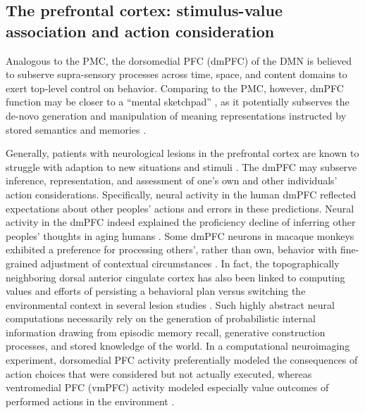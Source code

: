 \documentclass[10pt,letterpaper]{article}
\begin{document}
\subsection{The prefrontal cortex: stimulus-value association and action consideration}
Analogous to the PMC,
the dorsomedial PFC (dmPFC) of the DMN is believed to subserve
supra-sensory processes
across time, space, and content domains to
exert top-level control on behavior.
Comparing to the PMC, however,
dmPFC function may be closer to a
``mental sketchpad'' \citep{goldman1996prefrontal}, as it
potentially subserves the de-novo generation and manipulation
of meaning representations instructed by stored semantics and memories
\citep{bzdok2013segregation}.



Generally,
patients with neurological lesions in the prefrontal cortex
are known to struggle with
adaption to new situations and stimuli
\citep{stuss1986frontal}.
The dmPFC may subserve inference, representation, and assessment
of one's own and other individuals' action considerations.
Specifically, neural activity in the human dmPFC
reflected expectations about other peoples' actions and
errors in these predictions.
Neural activity in the dmPFC indeed explained the proficiency decline
of inferring other peoples' thoughts in aging humans \citep{moran2012social}.
Some dmPFC neurons in macaque monkeys exhibited a preference
for processing others', rather than own, behavior
with fine-grained adjustment of contextual circumstances \citep{yoshida2010neural}.
In fact, the topographically neighboring dorsal anterior cingulate cortex
has also been linked to computing values and efforts of
persisting a behavioral plan versus switching the
environmental context in several lesion studies \citep{kolling2016value}.
%
Such highly abstract neural computations necessarily rely on the
generation of probabilistic internal information drawing from
episodic memory recall, generative construction processes,
and stored knowledge of the world.
%
In a computational neuroimaging experiment,
dorsomedial PFC activity preferentially modeled the consequences of
action choices that were considered but not actually executed,
whereas ventromedial PFC (vmPFC) activity
modeled especially value outcomes of performed actions in the environment
\citep{nicolle2012agent}.
\end{document}
